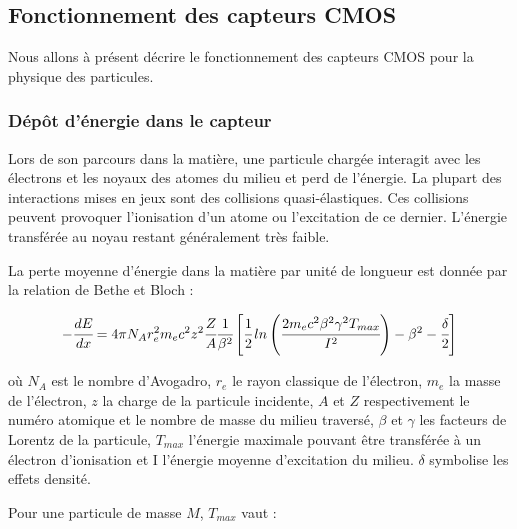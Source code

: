   
  \subsection{Fonctionnement des capteurs CMOS}
  
  Nous allons \`a pr\'esent d\'ecrire le fonctionnement des capteurs CMOS pour la physique des particules.
  
  \subsubsection{D\'epôt d'\'energie dans le capteur}
  \label{sect:bethe_bloch}
 
    Lors de son parcours dans la mati\`ere, une particule charg\'ee interagit avec les électrons et les noyaux des atomes du milieu et perd de l'\'energie. La plupart des interactions mises en jeux sont des collisions quasi-élastiques. Ces collisions peuvent provoquer l'ionisation d'un atome ou l'excitation de ce dernier. L'\'energie transf\'er\'ee au noyau restant g\'en\'eralement tr\`es faible.
    
    \medskip
    
    La perte moyenne d'\'energie dans la mati\`ere par unit\'e de longueur est donn\'ee par la relation de Bethe et Bloch :
    
    \[ -\cfrac{dE}{dx} = 4 \pi N_A r_e^2 m_e c^2 z^2 \cfrac{Z}{A} \cfrac{1}{\beta^2} \left[ \cfrac{1}{2} \, ln\left( \cfrac{2 m_e c^2 \beta^2 \gamma^2 T_{max} }{I^2} \right) - \beta^2 -\cfrac{\delta}{2} \right]  \]
 
    o\`u $N_A$ est le nombre d'Avogadro, $r_e$ le rayon classique de l'\'electron, $m_e$ la masse de l'\'electron, $z$ la charge de la particule incidente, $A$ et $Z$ respectivement le num\'ero atomique et le nombre de masse du milieu travers\'e, $\beta$ et $\gamma$ les facteurs de Lorentz de la particule, $T_{max}$ l'\'energie maximale pouvant \^etre transf\'er\'ee \`a un \'electron d'ionisation et I l'\'energie moyenne d'excitation du milieu. $\delta$ symbolise les effets densit\'e.
    
    Pour une particule de masse $M$, $T_{max}$ vaut :
    
